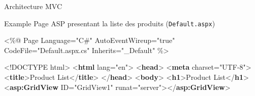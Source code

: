 \documentclass[
  ignorenonframetext,
]{beamer}
\newenvironment{Shaded}{\begin{snugshade}}{\end{snugshade}}
\newcommand{\DataTypeTok}[1]{\textcolor[rgb]{0.68,0.00,0.00}{#1}}
\newcommand{\ErrorTok}[1]{\textcolor[rgb]{0.68,0.00,0.00}{#1}}
\newcommand{\KeywordTok}[1]{\textcolor[rgb]{0.00,0.23,0.31}{\textbf{#1}}}
\newcommand{\NormalTok}[1]{\textcolor[rgb]{0.00,0.23,0.31}{#1}}
\newcommand{\OperatorTok}[1]{\textcolor[rgb]{0.37,0.37,0.37}{#1}}
\newcommand{\OtherTok}[1]{\textcolor[rgb]{0.00,0.23,0.31}{#1}}
\newcommand{\StringTok}[1]{\textcolor[rgb]{0.13,0.47,0.30}{#1}}
\begin{document}
\begin{frame}[fragile]{Architecture MVC}
\label{architecture-mvc}
\begin{block}{Example}
\label{example}
Page ASP presentant la liste des produits (\texttt{Default.aspx})

\begin{Shaded}
\begin{Highlighting}[]
\ErrorTok{\textless{}}\NormalTok{\%@ Page Language="C\#" AutoEventWireup="true" CodeFile="Default.aspx.cs" Inherits="\_Default" \%\textgreater{}}

\DataTypeTok{\textless{}!DOCTYPE}\NormalTok{ html}\DataTypeTok{\textgreater{}}
\DataTypeTok{\textless{}}\KeywordTok{html}\OtherTok{ lang}\OperatorTok{=}\StringTok{"en"}\DataTypeTok{\textgreater{}}
\DataTypeTok{\textless{}}\KeywordTok{head}\DataTypeTok{\textgreater{}}
    \DataTypeTok{\textless{}}\KeywordTok{meta}\OtherTok{ charset}\OperatorTok{=}\StringTok{"UTF{-}8"}\DataTypeTok{\textgreater{}}
    \DataTypeTok{\textless{}}\KeywordTok{title}\DataTypeTok{\textgreater{}}\NormalTok{Product List}\DataTypeTok{\textless{}/}\KeywordTok{title}\DataTypeTok{\textgreater{}}
\DataTypeTok{\textless{}/}\KeywordTok{head}\DataTypeTok{\textgreater{}}
\DataTypeTok{\textless{}}\KeywordTok{body}\DataTypeTok{\textgreater{}}
    \DataTypeTok{\textless{}}\KeywordTok{h1}\DataTypeTok{\textgreater{}}\NormalTok{Product List}\DataTypeTok{\textless{}/}\KeywordTok{h1}\DataTypeTok{\textgreater{}}
    \DataTypeTok{\textless{}}\KeywordTok{asp:GridView}\OtherTok{ ID}\OperatorTok{=}\StringTok{"GridView1"}\OtherTok{ runat}\OperatorTok{=}\StringTok{"server"}\DataTypeTok{\textgreater{}\textless{}/}\KeywordTok{asp:GridView}\DataTypeTok{\textgreater{}}


\end{Highlighting}
\end{Shaded}
\end{block}
\end{frame}
\end{document}
